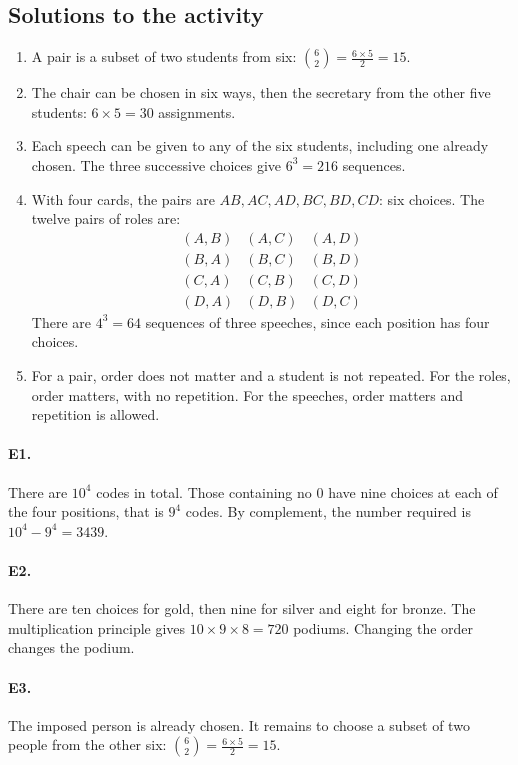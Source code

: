 \subsection{Solutions to the activity}\begin{enumerate}
\item A pair is a subset of two students from six: $\binom{6}{2}=\frac{6\times5}{2}=15$.
\item The chair can be chosen in six ways, then the secretary from the other five students: $6\times5=30$ assignments.
\item Each speech can be given to any of the six students, including one already chosen. The three successive choices give $6^3=216$ sequences.
\item With four cards, the pairs are $AB,AC,AD,BC,BD,CD$: six choices. The twelve pairs of roles are:\[\begin{array}{lll}(A,B)&(A,C)&(A,D)\\(B,A)&(B,C)&(B,D)\\(C,A)&(C,B)&(C,D)\\(D,A)&(D,B)&(D,C)\end{array}\] There are $4^3=64$ sequences of three speeches, since each position has four choices.
\item For a pair, order does not matter and a student is not repeated. For the roles, order matters, with no repetition. For the speeches, order matters and repetition is allowed.
\end{enumerate}

\paragraph{E1.}There are $10^4$ codes in total. Those containing no $0$ have nine choices at each of the four positions, that is $9^4$ codes. By complement, the number required is $10^4-9^4=3439$.

\paragraph{E2.}There are ten choices for gold, then nine for silver and eight for bronze. The multiplication principle gives $10\times9\times8=720$ podiums. Changing the order changes the podium.

\paragraph{E3.}The imposed person is already chosen. It remains to choose a subset of two people from the other six: $\binom{6}{2}=\frac{6\times5}{2}=15$.

